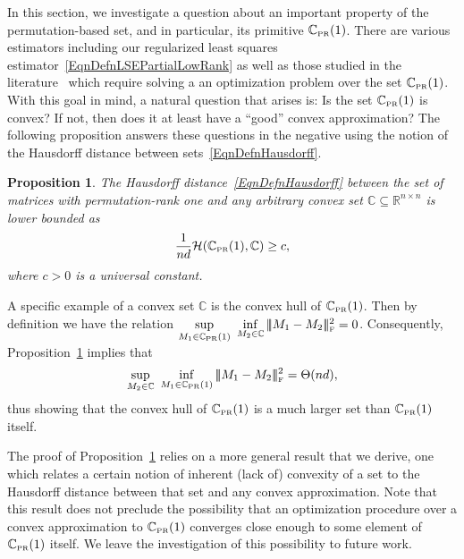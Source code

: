 \documentclass[11pt, hidelinks]{article} %
\newtheorem{proposition}{Proposition}
\newcommand{\matsnorm}[2]{|\!|\!| #1 | \! | \!|_{{#2}}}
\newcommand{\frobnorm}[1]{\ensuremath{\matsnorm{#1}{\mbox{\tiny{F}}}}}
\newcommand{\hausDis}{\mathcal{H}}
\newcommand{\reals}{\ensuremath{\mathbb{R}}}
\newcommand{\numrows}{n}
\newcommand{\numcols}{d}
\newcommand{\plaincon}{c}
\newcommand{\wtmatrix}{M}
\newcommand{\wt}{\wtmatrix}
\newcommand{\matrixset}{\mathbb{C}}
\newcommand{\permset}{\matrixset_{\mbox{\tiny PR}}}
\newcommand{\permone}{\permset(1)}
\newcommand{\convexclass}{\ensuremath{\mathbb{C}}}
\begin{document}
In this section, we investigate a question about an important property
of the permutation-based set, and in particular, its primitive
$\permone$. There are various estimators including our regularized least squares estimator~\eqref{EqnDefnLSEPartialLowRank} as well as those studied in the literature~\cite{shah2015stochastically, shah2016feeling, shah2016permutation} which require solving a an optimization problem over the set
$\permone$. With this goal in mind, a natural question that arises is: Is the set
$\permone$ is convex? If not, then does it at least have a ``good''
convex approximation? The following proposition answers these
questions in the negative using the notion of the Hausdorff distance between sets~\eqref{EqnDefnHausdorff}.
\begin{proposition}
\label{PropNoConvex}
The Hausdorff distance~\eqref{EqnDefnHausdorff} between the set of matrices with permutation-rank one and any arbitrary convex set
$\convexclass \subseteq \reals^{\numrows \times \numrows}$ is lower bounded as
\begin{align*}
\frac{1}{\numrows \numcols} 
\hausDis ( \permone , \convexclass )
\geq
\plaincon,
\end{align*}
where $\plaincon>0$ is a universal constant. 
\end{proposition}
A specific example of a convex set $\convexclass$ is the convex hull
of $\permone$. Then by definition we have the relation $\sup
\limits_{\wt_1 \in \permone} \ \inf \limits_{\wt_2 \in \convexclass}
\frobnorm{\wt_1 - \wt_2}^2 = 0$. Consequently,
Proposition~\ref{PropNoConvex} implies that
\begin{align*}
  \sup \limits_{\wt_2 \in \convexclass} \ \inf \limits_{\wt_1 \in
    \permone} \frobnorm{\wt_1 - \wt_2}^2 = \Theta(\numrows \numcols),
\end{align*}
thus showing that the convex hull of $\permone$ is a much larger set
than $\permone$ itself.

The proof of Proposition~\ref{PropNoConvex} relies on a more general
result that we derive, one which relates a certain notion of inherent
(lack of) convexity of a set to the Hausdorff distance between that
set and any convex approximation. Note that this result does not
preclude the possibility that an optimization procedure over a convex
approximation to $\permone$ converges close enough to some element of
$\permone$ itself. We leave the investigation of this possibility to
future work.
\end{document}
